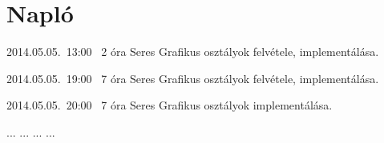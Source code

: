 %
\section{Napló}

\begin{naplo}

\bejegyzes
{2014.05.05.~13:00~}
{2 óra}
{Seres}
{Grafikus osztályok felvétele, implementálása.}

\bejegyzes
{2014.05.05.~19:00~}
{7 óra}
{Seres}
{Grafikus osztályok felvétele, implementálása.}

\bejegyzes
{2014.05.05.~20:00~}
{7 óra}
{Seres}
{Grafikus osztályok implementálása.}

\bejegyzes
{...}
{...}
{...}
{...}


\end{naplo}

